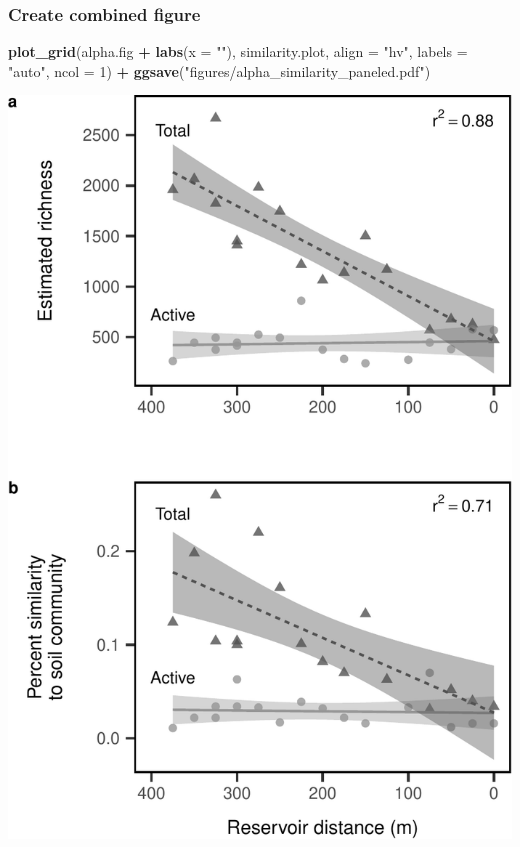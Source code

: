 \documentclass[]{article}
\newenvironment{Shaded}{\begin{snugshade}}{\end{snugshade}}
\newcommand{\KeywordTok}[1]{\textcolor[rgb]{0.13,0.29,0.53}{\textbf{#1}}}
\newcommand{\DataTypeTok}[1]{\textcolor[rgb]{0.13,0.29,0.53}{#1}}
\newcommand{\DecValTok}[1]{\textcolor[rgb]{0.00,0.00,0.81}{#1}}
\newcommand{\StringTok}[1]{\textcolor[rgb]{0.31,0.60,0.02}{#1}}
\newcommand{\OperatorTok}[1]{\textcolor[rgb]{0.81,0.36,0.00}{\textbf{#1}}}
\newcommand{\NormalTok}[1]{#1}
\begin{document}
\subsubsection{Create combined figure}\label{create-combined-figure}

\begin{Shaded}
\begin{Highlighting}[]
\KeywordTok{plot_grid}\NormalTok{(alpha.fig }\OperatorTok{+}\StringTok{ }\KeywordTok{labs}\NormalTok{(}\DataTypeTok{x =} \StringTok{""}\NormalTok{), similarity.plot, }
          \DataTypeTok{align =} \StringTok{"hv"}\NormalTok{,}
          \DataTypeTok{labels =} \StringTok{"auto"}\NormalTok{, }\DataTypeTok{ncol =} \DecValTok{1}\NormalTok{) }\OperatorTok{+}
\StringTok{  }\KeywordTok{ggsave}\NormalTok{(}\StringTok{"figures/alpha_similarity_paneled.pdf"}\NormalTok{)}
\end{Highlighting}
\end{Shaded}

\begin{center}\includegraphics{ReservoirGradient_files/figure-latex/combined-plots-1} \end{center}
\end{document}
